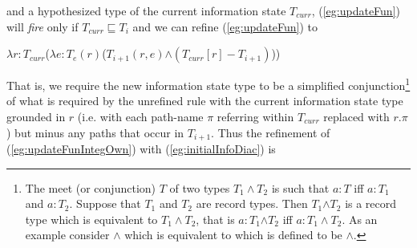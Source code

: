  
 
 
   
  


and a hypothesized type of the current
information state $T_{\mathit{curr}}$, (\ref{eg:updateFun}) will
\textit{fire} only if $T_{\mathit{curr}} \sqsubseteq T_i$ and we can
refine (\ref{eg:updateFun}) to 

$\lambda r:T_{\mathit{curr}}$($\lambda
e:T_e(r)$($T_{i+1}(r,e)$\d{$\wedge$}$(T_{\mathit{curr}}[r]-T_{i+1})$))

That is, we require the new information state type to be a simplified
conjunction\footnote{The meet (or conjunction) $T$ of two types $T_1\wedge
  T_2$ is such that $a:T$ iff $a:T_1$ and $a:T_2$.  Suppose that $T_1$
  and $T_2$ are record types.  Then $T_1$\d{$\wedge$}$T_2$ is a record
  type which is equivalent to $T_1\wedge T_2$, that is
  $a:T_1$\d{$\wedge$}$T_2$ iff $a:T_1\wedge T_2$.  As an example
  consider
  $\wedge$
  which is equivalent to  which is
  defined to be \d{$\wedge$}.}
of what is required by the unrefined rule with the current information
state type grounded in $r$ (i.e. with each path-name $\pi$ referring within
$T_{\mathit{curr}}$ replaced with $r.\pi$) but minus any paths that
occur in $T_{i+1}$.  Thus the refinement of
(\ref{eg:updateFunIntegOwn}) with (\ref{eg:initialInfoDiac}) is

